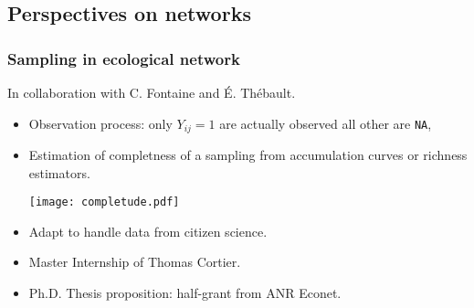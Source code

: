 \documentclass[nopagenumber,9pt]{beamer}
\begin{document}
\subsection{Perspectives on networks}


\begin{frame}
 \frametitle{Sampling in ecological network}
In collaboration with C. Fontaine and \'E. Thébault.
 
 
 \begin{itemize}
  \item Observation process: only $Y_{ij}=1$ are actually observed all other are \texttt{NA}, 
  
  
  \item Estimation of completness of a sampling from accumulation curves or richness estimators.
 
 
 
 \texttt{[image: completude.pdf]}
 
 \item Adapt to handle data from citizen science.

 
  \item Master Internship of Thomas Cortier.

\item  Ph.D. Thesis proposition: half-grant from ANR Econet.

 \end{itemize}

\end{frame}

% 
%  
\end{document}
